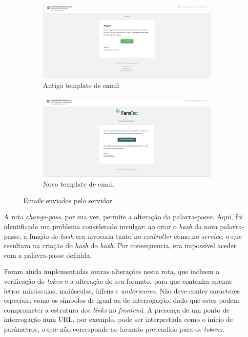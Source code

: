 \begin{figure}[!h]
	\centering
	\begin{subfigure}[c]{0.45\textwidth}
		\centering
		\includegraphics[width=\textwidth]{figs/oldEmail.png}
		\caption{Antigo template de email}
		\label{fig:oldEmail}
	\end{subfigure}
	\hfill
	\begin{subfigure}[c]{0.45\textwidth}
		\centering
		\includegraphics[width=\textwidth]{figs/email.png}
		\caption{Novo template de email}
		\label{fig:newEmail} 
	\end{subfigure}
	\caption{Emails enviados pelo servidor}
\end{figure}


A rota \textit{change-pass}, por sua vez, permite a alteração da palavra-passe. Aqui, foi identificado um problema considerado invulgar: ao criar o \textit{hash} da nova palavra-passe, a função de \textit{hash} era invocada tanto no \textit{controller} como no \textit{service}, o que resultava na criação do \textit{hash} do \textit{hash}. Por consequencia, era impossível aceder com a palavra-passe definida.

Foram ainda implementadas outras alterações nesta rota, que incluem a verificação do \textit{token} e a alteração do seu formato, para que contenha apenas letras minúsculas, maiúsculas, hífens e \textit{underscores}. Não deve conter caracteres especiais, como os símbolos de igual ou de interrogação, dado que estes podem comprometer a estrutura dos \textit{links} no \textit{frontend}. A presença de um ponto de interrogação num URL, por exemplo, pode ser interpretada como o início de parâmetros, o que não corresponde ao formato pretendido para os \textit{tokens}.

